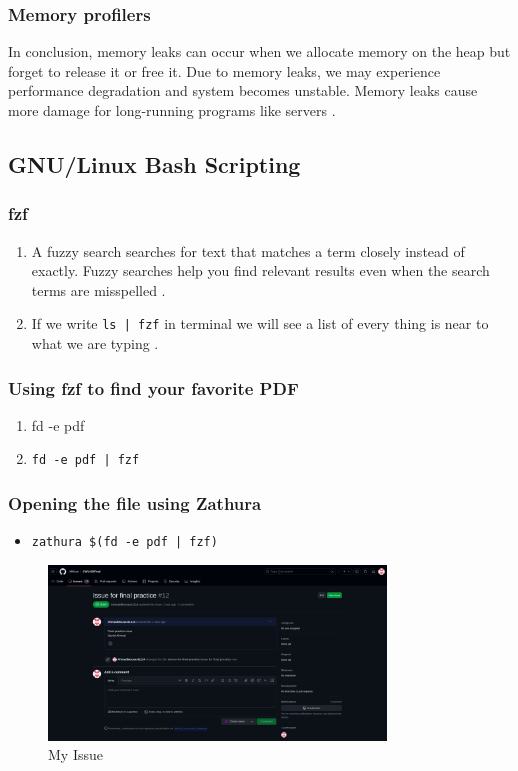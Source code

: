 \documentclass{article}
\begin{document}
\subsubsection{Memory profilers}
In conclusion, memory leaks can occur when we allocate memory on the heap but forget to release it or free it. Due to memory leaks, we may experience performance degradation and system becomes unstable. Memory leaks cause more damage for long-running programs like servers .
\newpage
\subsection{GNU/Linux Bash Scripting}
\subsubsection{fzf}
\begin{enumerate}
    \item{A fuzzy search searches for text that matches a term closely instead of exactly. Fuzzy searches help you find relevant results even when the search terms are misspelled .}
    \item{If we write \texttt{ls | fzf} in terminal we will see a list of every thing is near to what we are typing .}
\end{enumerate}
\subsubsection{Using fzf to find your favorite PDF}
\begin{enumerate}
    \item{fd -e pdf }
    \item{\texttt{fd -e pdf | fzf}}
\end{enumerate}
\subsubsection{Opening the file using Zathura}
\begin{itemize}
    \item{\texttt{zathura \$(fd -e pdf | fzf)}}
\end{itemize}

\begin{figure}
  \begin{center}
    \includegraphics[width = 0.8\textwidth]{issue.png}
  \end{center}
  \begin{center}
      \caption{My Issue}
  \end{center}
  
\end{figure}
\end{document}
